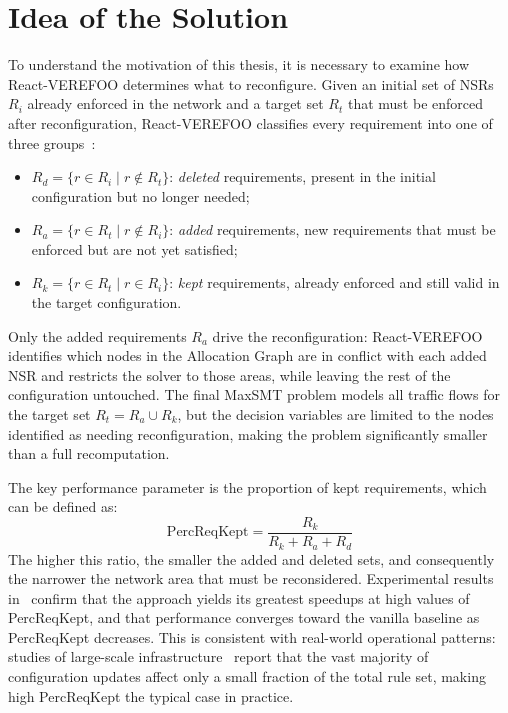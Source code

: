 
\section{Idea of the Solution}


To understand the motivation of this thesis, it is necessary to examine how React-VEREFOO determines what to reconfigure. Given an initial set of NSRs $R_i$ already enforced in the network and a target set $R_t$ that must be enforced after reconfiguration, React-VEREFOO classifies every requirement into one of three groups~\cite{reactverefoo}:

\begin{itemize}
  \item $R_d = \{r \in R_i \mid r \notin R_t\}$: \textit{deleted} requirements, present in the initial configuration but no longer needed;
  \item $R_a = \{r \in R_t \mid r \notin R_i\}$: \textit{added} requirements, new requirements that must be enforced but are not yet satisfied;
  \item $R_k = \{r \in R_t \mid r \in R_i\}$: \textit{kept} requirements, already enforced and still valid in the target configuration.
\end{itemize}

Only the added requirements $R_a$ drive the reconfiguration: React-VEREFOO identifies which nodes in the Allocation Graph are in conflict with each added NSR and restricts the solver to those areas, while leaving the rest of the configuration untouched. The final MaxSMT problem models all traffic flows for the target set $R_t = R_a \cup R_k$, but the decision variables are limited to the nodes identified as needing reconfiguration, making the problem significantly smaller than a full recomputation. 

The key performance parameter is the proportion of kept requirements, which can be defined as:
\[
  \text{PercReqKept} = \frac{R_k}{R_k + R_a + R_d}
\]
The higher this ratio, the smaller the added and deleted sets, and consequently the narrower the network area that must be reconsidered. Experimental results in~\cite{reactverefoo} confirm that the approach yields its greatest speedups at high values of PercReqKept, and that performance converges toward the vanilla baseline as PercReqKept decreases. This is consistent with real-world operational patterns: studies of large-scale infrastructure~\cite{reactverefoo} report that the vast majority of configuration updates affect only a small fraction of the total rule set, making high PercReqKept the typical case in practice.

